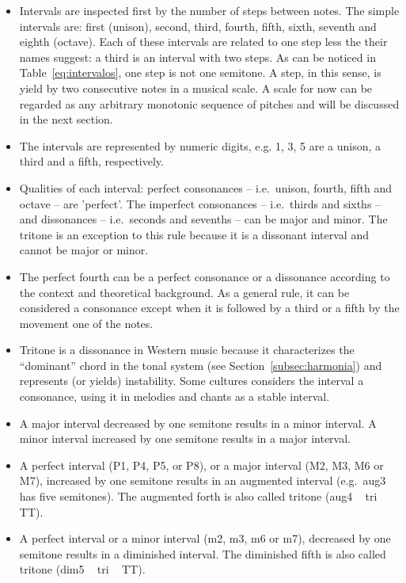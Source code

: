 \begin{itemize}
	\item Intervals are inspected first by the number of steps between notes. The simple intervals are: first (unison), second, third, fourth, fifth, sixth, seventh and eighth (octave).
		Each of these intervals are related to one step less the their names suggest: a third is an interval with two steps.
		As can be noticed in Table~\ref{eq:intervalos}, one step is not one semitone.
		A step, in this sense, is yield by two consecutive notes in a musical scale.
		A scale for now can be regarded as any arbitrary monotonic sequence of pitches and will be discussed in the next section.
	\item The intervals are represented by numeric digits, e.g. 1, 3, 5 are a unison, a third and a fifth, respectively.
	\item Qualities of each interval: perfect consonances --
                i.e.\ unison, fourth, fifth and octave -- are 'perfect'. The imperfect consonances -- i.e.\ thirds and sixths -- and dissonances -- i.e.\ seconds and sevenths -- can be major and minor. The tritone is an exception to this rule because it is a dissonant interval and cannot be major or minor.
	\item The perfect fourth can be a perfect consonance or a dissonance according to the context and theoretical background. As a general rule, it can be considered a consonance except when it is followed by a third or a fifth by the movement one of the notes.
	\item Tritone is a dissonance in Western music because
		it characterizes the ``dominant'' chord in the tonal system (see Section~\ref{subsec:harmonia}) and represents (or yields) instability. Some cultures considers the interval a consonance, using it in melodies and chants as a stable interval.
	\item A major interval decreased by one semitone results in a minor interval. A minor interval increased by one semitone results in a major interval.
	\item A perfect interval (P1, P4, P5, or P8), or a major interval (M2, M3, M6 or M7), increased
by one semitone results in an augmented interval (e.g.\
aug3 has five semitones). The augmented forth
is also called tritone (aug4 ~ tri ~ TT).
	\item A perfect interval or a minor interval (m2, m3, m6 or m7), decreased by one semitone results in a diminished interval. The
diminished fifth is also called tritone (dim5 ~ tri ~ TT).


\end{itemize}

